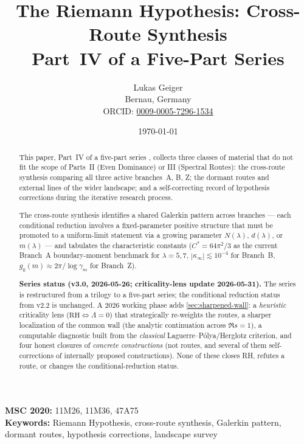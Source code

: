 \documentclass[12pt,a4paper]{article}
\title{The Riemann Hypothesis: Cross-Route Synthesis\\[4pt]
\large Part~IV of a Five-Part Series}
\author{Lukas Geiger\\
\small Bernau, Germany\\
\small ORCID: \href{https://orcid.org/0009-0005-7296-1534}{0009-0005-7296-1534}}
\date{\today}
\theoremstyle{definition}
\theoremstyle{remark}
\begin{document}
\overfullrule=0pt
\maketitle

\begin{abstract}\footnotesize
This paper, Part~IV of a five-part series
\cite{Geiger2026partI,Geiger2026partII,Geiger2026partIII,Geiger2026partV},
collects three classes of material that do not fit the scope of Parts~II
(Even Dominance) or III (Spectral Routes): the cross-route synthesis
comparing all three active branches~A, B, Z; the dormant routes and
external lines of the wider landscape; and a self-correcting record of
hypothesis corrections during the iterative research process.

The cross-route synthesis identifies a shared Galerkin pattern across
branches --- each conditional reduction involves a fixed-parameter
positive structure that must be promoted to a uniform-limit statement via
a growing parameter $N(\lambda)$, $d(\lambda)$, or $m(\lambda)$ --- and
tabulates the characteristic constants ($C^* = 64\pi^2/3$ as the
current Branch~A boundary-moment benchmark for $\lambda=5,7$,
$|\kappa_\infty|\lesssim 10^{-4}$ for Branch~B,
$g_0(m) \approx 2\pi/\log\gamma_m$ for Branch~Z).

\medskip\noindent
\textbf{Series status (v3.0, 2026-05-26; criticality-lens update 2026-05-31).}
The series is restructured from a trilogy to a five-part series; the
conditional reduction status from v2.2 is unchanged. A 2026 working phase adds
\cref{sec:sharpened-wall}: a \emph{heuristic} criticality lens
($\mathrm{RH}\Leftrightarrow\Lambda=0$) that strategically re-weights the routes,
a sharper localization of the common wall (the analytic continuation across
$\Re s=1$), a computable diagnostic built from the \emph{classical}
Laguerre--P\'olya/Herglotz criterion, and four honest closures of
\emph{concrete constructions} (not routes, and several of them self-corrections
of internally proposed constructions). None of these closes RH, refutes a route,
or changes the conditional-reduction status.
\end{abstract}

{\footnotesize
\noindent\textbf{MSC 2020:} 11M26, 11M36, 47A75\\
\textbf{Keywords:} Riemann Hypothesis, cross-route synthesis,
Galerkin pattern, dormant routes, hypothesis corrections,
landscape survey
}

\clearpage
\tableofcontents
\clearpage
\end{document}
